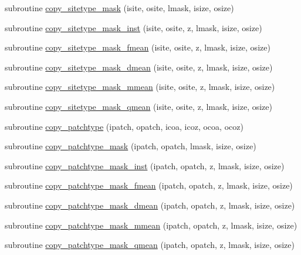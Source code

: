 \begin{DoxyCompactItemize}
\item 
subroutine \hyperlink{namespaceed__state__vars_abd0a1c636db86530367e9d24e386ec22}{copy\+\_\+sitetype\+\_\+mask} (isite, osite, lmask, isize, osize)
\item 
subroutine \hyperlink{namespaceed__state__vars_a1df5eb7cbed41bfe98b1c6ac5686b8cb}{copy\+\_\+sitetype\+\_\+mask\+\_\+inst} (isite, osite, z, lmask, isize, osize)
\item 
subroutine \hyperlink{namespaceed__state__vars_aa441ba026af189af30a9464c62ad25d3}{copy\+\_\+sitetype\+\_\+mask\+\_\+fmean} (isite, osite, z, lmask, isize, osize)
\item 
subroutine \hyperlink{namespaceed__state__vars_a1589be18b91e5861e128f61854e408a6}{copy\+\_\+sitetype\+\_\+mask\+\_\+dmean} (isite, osite, z, lmask, isize, osize)
\item 
subroutine \hyperlink{namespaceed__state__vars_a37a6591c81160dba788b7db2a66003d1}{copy\+\_\+sitetype\+\_\+mask\+\_\+mmean} (isite, osite, z, lmask, isize, osize)
\item 
subroutine \hyperlink{namespaceed__state__vars_a3cf450bc1662a96c51b849a2b95f4d97}{copy\+\_\+sitetype\+\_\+mask\+\_\+qmean} (isite, osite, z, lmask, isize, osize)
\item 
subroutine \hyperlink{namespaceed__state__vars_accd794e0e8d71ba375c3669097ae5c8d}{copy\+\_\+patchtype} (ipatch, opatch, icoa, icoz, ocoa, ocoz)
\item 
subroutine \hyperlink{namespaceed__state__vars_a8d1f42b1112652da9f1e05929cdb29a1}{copy\+\_\+patchtype\+\_\+mask} (ipatch, opatch, lmask, isize, osize)
\item 
subroutine \hyperlink{namespaceed__state__vars_aa9c50f14b3b7cdf0b27019486921c8dd}{copy\+\_\+patchtype\+\_\+mask\+\_\+inst} (ipatch, opatch, z, lmask, isize, osize)
\item 
subroutine \hyperlink{namespaceed__state__vars_a1b0d514260b90af76ca01eb35453722a}{copy\+\_\+patchtype\+\_\+mask\+\_\+fmean} (ipatch, opatch, z, lmask, isize, osize)
\item 
subroutine \hyperlink{namespaceed__state__vars_afdb52860e9dff4bb1917d54009d84d68}{copy\+\_\+patchtype\+\_\+mask\+\_\+dmean} (ipatch, opatch, z, lmask, isize, osize)
\item 
subroutine \hyperlink{namespaceed__state__vars_a35a0142a5bd5bfb026012c1e9c38dbf5}{copy\+\_\+patchtype\+\_\+mask\+\_\+mmean} (ipatch, opatch, z, lmask, isize, osize)
\item 
subroutine \hyperlink{namespaceed__state__vars_a4fb10d3b10b1c5d40c2c36d89c8121ee}{copy\+\_\+patchtype\+\_\+mask\+\_\+qmean} (ipatch, opatch, z, lmask, isize, osize)

\end{DoxyCompactItemize}
